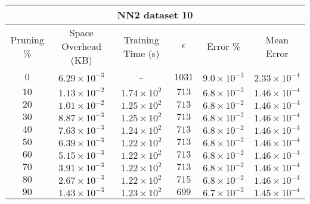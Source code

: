 \begin{adjustwidth}{0cm}{}
\begin{tabular}{cccccc}
\hline
\multicolumn{6}{c}{NN2 dataset 10} \\
\toprule
Pruning \% & Space Overhead (KB) & Training Time (s) & $\epsilon$ & Error \% & Mean Error\\
\midrule
$0$ & $6.29 \times 10^{-3}$ & - & $1031$ & $9.0 \times 10^{-2}$ & $2.33 \times 10^{-4}$\\
$10$ & $1.13 \times 10^{-2}$ & $1.74 \times 10^{2}$ & $713$ & $6.8 \times 10^{-2}$ & $1.46 \times 10^{-4}$\\
$20$ & $1.01 \times 10^{-2}$ & $1.25 \times 10^{2}$ & $713$ & $6.8 \times 10^{-2}$ & $1.46 \times 10^{-4}$\\
$30$ & $8.87 \times 10^{-3}$ & $1.25 \times 10^{2}$ & $713$ & $6.8 \times 10^{-2}$ & $1.46 \times 10^{-4}$\\
$40$ & $7.63 \times 10^{-3}$ & $1.24 \times 10^{2}$ & $713$ & $6.8 \times 10^{-2}$ & $1.46 \times 10^{-4}$\\
$50$ & $6.39 \times 10^{-3}$ & $1.22 \times 10^{2}$ & $713$ & $6.8 \times 10^{-2}$ & $1.46 \times 10^{-4}$\\
$60$ & $5.15 \times 10^{-3}$ & $1.22 \times 10^{2}$ & $713$ & $6.8 \times 10^{-2}$ & $1.46 \times 10^{-4}$\\
$70$ & $3.91 \times 10^{-3}$ & $1.22 \times 10^{2}$ & $713$ & $6.8 \times 10^{-2}$ & $1.46 \times 10^{-4}$\\
$80$ & $2.67 \times 10^{-3}$ & $1.22 \times 10^{2}$ & $715$ & $6.8 \times 10^{-2}$ & $1.46 \times 10^{-4}$\\
$90$ & $1.43 \times 10^{-3}$ & $1.23 \times 10^{2}$ & $699$ & $6.7 \times 10^{-2}$ & $1.45 \times 10^{-4}$\\
\bottomrule
\end{tabular}
\end{adjustwidth}

\newpage

